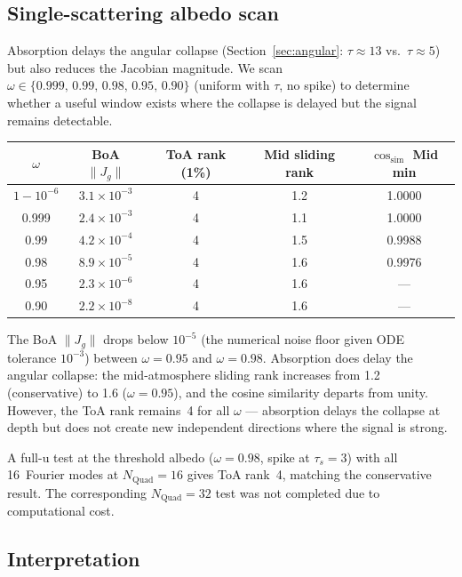 \documentclass[11pt]{article}
\newcommand{\norm}[1]{\lVert #1 \rVert}
\begin{document}
\subsection{Single-scattering albedo scan}

Absorption delays the angular collapse
(Section~\ref{sec:angular}: $\tau\approx 13$ vs.\ $\tau\approx 5$)
but also reduces the Jacobian magnitude.  We scan
$\omega \in \{0.999,\, 0.99,\, 0.98,\, 0.95,\, 0.90\}$
(uniform with $\tau$, no spike) to determine whether a useful
window exists where the collapse is delayed but the signal remains
detectable.

\begin{center}
\begin{tabular}{c c c c c}
\toprule
$\omega$ & BoA $\norm{J_g}$ & ToA rank (1\%)
  & Mid sliding rank & $\cos_\mathrm{sim}$ Mid min\\
\midrule
$1 - 10^{-6}$ & $3.1\times10^{-3}$ & 4 & 1.2 & 1.0000\\
0.999          & $2.4\times10^{-3}$ & 4 & 1.1 & 1.0000\\
0.99           & $4.2\times10^{-4}$ & 4 & 1.5 & 0.9988\\
0.98           & $8.9\times10^{-5}$ & 4 & 1.6 & 0.9976\\
0.95           & $2.3\times10^{-6}$ & 4 & 1.6 & ---\\
0.90           & $2.2\times10^{-8}$ & 4 & 1.6 & ---\\
\bottomrule
\end{tabular}
\end{center}

The BoA $\norm{J_g}$ drops below $10^{-5}$ (the numerical noise
floor given ODE tolerance $10^{-3}$) between $\omega = 0.95$
and $\omega = 0.98$.  Absorption does delay the angular collapse:
the mid-atmosphere sliding rank increases from 1.2 (conservative)
to 1.6 ($\omega = 0.95$), and the cosine similarity departs from
unity.  However, the ToA rank remains~4 for all $\omega$ ---
absorption delays the collapse at depth but does not create new
independent directions where the signal is strong.

A full-u test at the threshold albedo ($\omega = 0.98$, spike at
$\tau_s = 3$) with all 16~Fourier modes at $N_\mathrm{Quad}=16$
gives ToA rank~4, matching the conservative result.  The
corresponding $N_\mathrm{Quad}=32$ test was not completed due to
computational cost.


\subsection{Interpretation}
\end{document}
